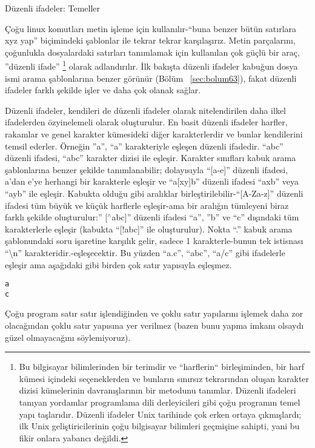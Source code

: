 \begin{section}{Düzenli ifadeler: Temeller}

Çoğu linux komutları metin işleme için kullanılır-“buna benzer bütün satırlara xyz yap” biçimindeki şablonlar ile tekrar tekrar karşılaşırız. Metin parçalarını, çoğunlukla dosyalardaki satırları tanımlamak için kullanılan çok güçlü bir araç, ”düzenli ifade”
\footnote{Bu bilgisayar bilimlerinden bir terimdir ve “harflerin“ birleşiminden, bir harf kümesi içindeki seçeneklerden ve bunların sınırsız tekrarından oluşan karakter dizisi kümelerinin davranışlarının bir metodunu tanımlar. Düzenli ifadeleri tanıyan yordamlar programlama dili derleyicileri gibi çoğu programın temel yapı taşlarıdır. Düzenli ifadeler Unix tarihinde çok erken ortaya çıkmışlardı; ilk Unix geliştiricilerinin çoğu bilgisayar bilimleri geçmişine sahipti, yani bu fikir onlara yabancı değildi.} olarak adlandırılır. İlk bakışta düzenli ifadeler kabuğun dosya ismi arama şablonlarına benzer görünür (Bölüm ~\ref{sec:bolum63}), fakat düzenli ifadeler farklı şekilde işler ve daha çok olanak sağlar.

Düzenli ifadeler, kendileri de düzenli ifadeler olarak nitelendirilen daha ilkel ifadelerden özyinelemeli olarak oluşturulur. En basit düzenli ifadeler harfler, rakamlar ve genel karakter kümesideki diğer karakterlerdir ve bunlar kendilerini temsil ederler. Örneğin ”a”, “a” karakteriyle eşleşen düzenli ifadedir. “abc” düzenli ifadesi, “abc” karakter dizisi ile eşleşir. Karakter sınıfları kabuk arama şablonlarına benzer şekilde tanımlanabilir; dolayısıyla “[a-e]” düzenli ifadesi, a’dan e’ye herhangi bir karakterle eşleşir ve “a[xy]b” düzenli ifadesi “axb” veya “ayb” ile eşleşir. Kabukta olduğu gibi aralıklar birleştirilebilir-“[A-Za-z]” düzenli ifadesi tüm büyük ve küçük harflerle eşleşir-ama bir aralığın tümleyeni biraz farklı şekilde oluşturulur:” [$ ^\wedge $abc]” düzenli ifadesi  “a”, ”b” ve “c” dışındaki tüm karakterlerle eşleşir (kabukta “[!abc]” ile oluşturulur). Nokta “.” kabuk arama şablonundaki soru işaretine karşılık gelir, sadece 1 karakterle-bunun tek istisnası “\textbackslash n” karakteridir.-eşleşecektir. Bu yüzden “a.c”, “abc”, “a/c” gibi ifadelerle eşleşir ama aşağıdaki gibi birden çok satır yapısıyla eşleşmez.
\begin{verbatim}
a
c
\end{verbatim}

Çoğu program satır satır işlendiğinden  ve çoklu satır yapılarını işlemek daha zor olacağından çoklu satır yapısına yer verilmez (bazen bunu yapma imkanı olsaydı güzel olmayacağını söylemiyoruz).


\end{section}
